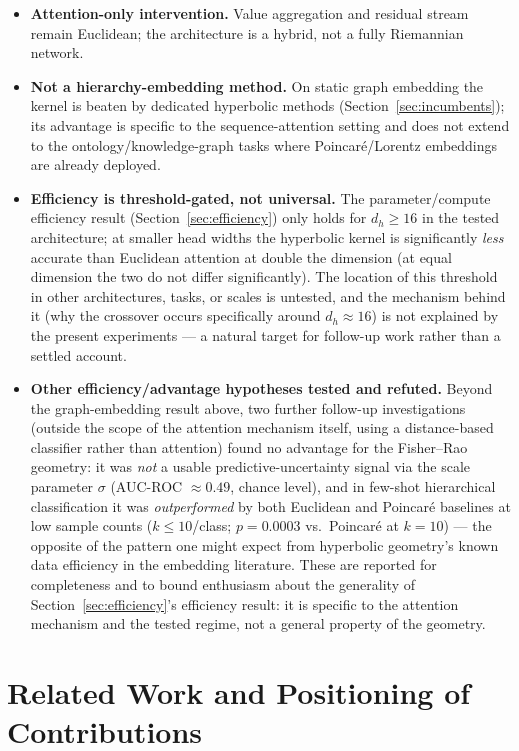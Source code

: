\documentclass[11pt]{article}
\begin{document}
\begin{itemize}
\item \textbf{Attention-only intervention.} Value aggregation and residual stream remain Euclidean; the architecture is a hybrid, not a fully Riemannian network.
\item \textbf{Not a hierarchy-embedding method.} On static graph embedding the kernel is beaten by dedicated hyperbolic methods (Section~\ref{sec:incumbents}); its advantage is specific to the sequence-attention setting and does not extend to the ontology/knowledge-graph tasks where Poincar\'e/Lorentz embeddings are already deployed.
\item \textbf{Efficiency is threshold-gated, not universal.} The parameter/compute efficiency result (Section~\ref{sec:efficiency}) only holds for $d_h \ge 16$ in the tested architecture; at smaller head widths the hyperbolic kernel is significantly \emph{less} accurate than Euclidean attention at double the dimension (at equal dimension the two do not differ significantly). The location of this threshold in other architectures, tasks, or scales is untested, and the mechanism behind it (why the crossover occurs specifically around $d_h \approx 16$) is not explained by the present experiments --- a natural target for follow-up work rather than a settled account.
\item \textbf{Other efficiency/advantage hypotheses tested and refuted.} Beyond the graph-embedding result above, two further follow-up investigations (outside the scope of the attention mechanism itself, using a distance-based classifier rather than attention) found no advantage for the Fisher--Rao geometry: it was \emph{not} a usable predictive-uncertainty signal via the scale parameter $\sigma$ (AUC-ROC $\approx 0.49$, chance level), and in few-shot hierarchical classification it was \emph{outperformed} by both Euclidean and Poincar\'e baselines at low sample counts ($k \le 10$/class; $p = 0.0003$ vs.\ Poincar\'e at $k = 10$) --- the opposite of the pattern one might expect from hyperbolic geometry's known data efficiency in the embedding literature. These are reported for completeness and to bound enthusiasm about the generality of Section~\ref{sec:efficiency}'s efficiency result: it is specific to the attention mechanism and the tested regime, not a general property of the geometry.
\end{itemize}

\section{Related Work and Positioning of Contributions}\label{sec:related}
\end{document}
